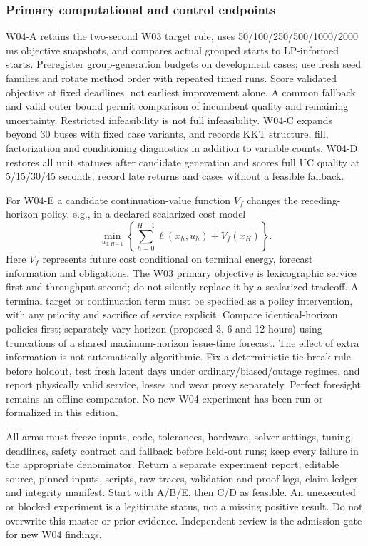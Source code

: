 \documentclass[11pt,letterpaper]{article}
\begin{document}
\subsubsection{Primary computational and control endpoints}
W04-A retains the two-second W03 target rule, uses 50/100/250/500/1000/2000 ms objective snapshots, and compares actual grouped starts to LP-informed starts. Preregister group-generation budgets on development cases; use fresh seed families and rotate method order with repeated timed runs. Score validated objective at fixed deadlines, not earliest improvement alone. A common fallback and valid outer bound permit comparison of incumbent quality and remaining uncertainty. Restricted infeasibility is not full infeasibility. W04-C expands beyond 30 buses with fixed case variants, and records KKT structure, fill, factorization and conditioning diagnostics in addition to variable counts. W04-D restores all unit statuses after candidate generation and scores full UC quality at 5/15/30/45 seconds; record late returns and cases without a feasible fallback.

For W04-E a candidate continuation-value function $V_f$ changes the receding-horizon policy, e.g., in a declared scalarized cost model
\[
 \min_{u_{0:H-1}}\left\{\sum_{h=0}^{H-1}\ell(x_h,u_h)+V_f(x_H)\right\}.
\]
Here $V_f$ represents future cost conditional on terminal energy, forecast information and obligations. The W03 primary objective is lexicographic service first and throughput second; do not silently replace it by a scalarized tradeoff. A terminal target or continuation term must be specified as a policy intervention, with any priority and sacrifice of service explicit. Compare identical-horizon policies first; separately vary horizon (proposed 3, 6 and 12 hours) using truncations of a shared maximum-horizon issue-time forecast. The effect of extra information is not automatically algorithmic. Fix a deterministic tie-break rule before holdout, test fresh latent days under ordinary/biased/outage regimes, and report physically valid service, losses and wear proxy separately. Perfect foresight remains an offline comparator. No new W04 experiment has been run or formalized in this edition.

All arms must freeze inputs, code, tolerances, hardware, solver settings, tuning, deadlines, safety contract and fallback before held-out runs; keep every failure in the appropriate denominator. Return a separate experiment report, editable source, pinned inputs, scripts, raw traces, validation and proof logs, claim ledger and integrity manifest. Start with A/B/E, then C/D as feasible. An unexecuted or blocked experiment is a legitimate status, not a missing positive result. Do not overwrite this master or prior evidence. Independent review is the admission gate for new W04 findings.
\end{document}
